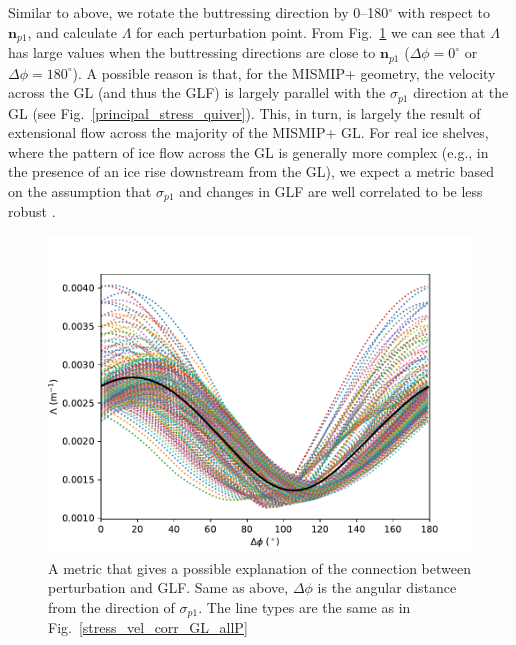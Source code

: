 \documentclass[tc, manuscript]{copernicus}
\begin{document}
Similar to above, we rotate the buttressing direction by 0--180$^\circ$ with respect to $\mathbf{n}_{p1}$, and calculate $\Lambda$ for each perturbation point. From Fig.~\ref{new_metric_new} we can see that $\Lambda$ has large values when the buttressing directions are close to $\mathbf{n}_{p1}$ ($\Delta\phi=0^\circ$ or $\Delta\phi=180^\circ$). A possible reason is that, for the MISMIP+ geometry, the velocity across the GL (and thus the GLF) is largely parallel with the $\sigma_{p1}$ direction at the GL (see Fig.~\ref{principal_stress_quiver}). This, in turn, is largely the result of extensional flow across the majority of the MISMIP+ GL.
For real ice shelves, where the pattern of ice flow across the GL is generally more complex (e.g., in the presence of an ice rise downstream from the GL), we expect a metric based on the assumption that $\sigma_{p1}$ and changes in GLF are well correlated to be less robust
.  


\begin{figure}
	\centering
    \includegraphics[width=1\linewidth]{figs/new_metric_new.pdf}
    \caption{A metric that gives a possible explanation of the connection between perturbation and GLF. Same as above, $\Delta\phi$ is the angular distance from the direction of $\sigma_{p1}$. The line types are the same as in Fig.~\ref{stress_vel_corr_GL_allP}}
	\label{new_metric_new}
\end{figure}
\end{document}
